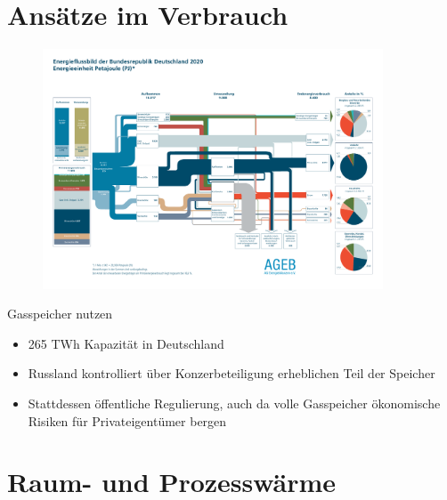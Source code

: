 \documentclass[10pt]{beamer}
\begin{document}
\section{Ansätze im Verbrauch}

\begin{frame}
\begin{figure}
\includegraphics[width=0.9\textwidth]{fig/Energieflussbild-2020_PJ_lang_DE_20220401}

\scriptsize{}
\end{figure}
\end{frame}

\begin{frame}{Gasspeicher nutzen}
  \begin{itemize}
    \item 265 TWh Kapazität in Deutschland 
    \item Russland kontrolliert über Konzerbeteiligung erheblichen Teil der Speicher
    \item Stattdessen öffentliche Regulierung, 
      auch da volle Gasspeicher ökonomische Risiken für Privateigentümer bergen 
  \end{itemize}
\end{frame}

\section{Raum- und Prozesswärme}
\end{document}
